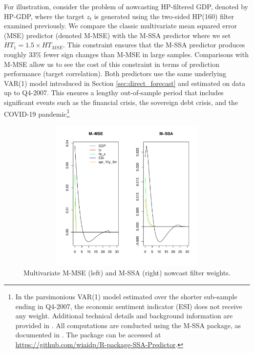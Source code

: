 \documentclass[11pt,a4paper]{article}
\begin{document}
For illustration, consider the problem of nowcasting HP-filtered GDP, denoted by HP-GDP, where the target $z_t$ is generated using the two-sided HP(160) filter examined previously. We compare the classic multivariate mean squared error (MSE) predictor (denoted M-MSE) with the M-SSA predictor where we set $HT_1=1.5\times HT_{MSE}$. This constraint ensures that the M-SSA predictor produces roughly 33$\%$ fewer sign changes than M-MSE in large samples. Comparisons with M-MSE allow us to see the cost of this constraint in terms of prediction performance (target correlation). 
Both predictors use the same underlying VAR(1) model introduced in Section \ref{sec:direct_forecast} and estimated on data up to Q4-2007. This ensures a lengthy out-of-sample period that includes significant events such as the financial crisis, the sovereign debt crisis, and the COVID-19 pandemic\footnote{In the parsimonious VAR(1) model estimated over the shorter sub-sample ending in Q4-2007, the economic sentiment indicator (ESI) does not receive any weight. Additional technical details and background information are provided in \cite{Wildi2025}. All computations are conducted using the M-SSA package, as documented in \cite{Wildi2025}. The package can be accessed at \url{https://github.com/wiaidp/R-package-SSA-Predictor}.}

\begin{figure}[htpb]
    \begin{center}
        \includegraphics[height=3in, width=4.5in]{./Figures/bk_gammak.pdf}
        \caption{Multivariate M-MSE (left) and M-SSA (right) nowcast filter weights.
        \label{bk_gammak}}
    \end{center}
\end{figure}
\end{document}
